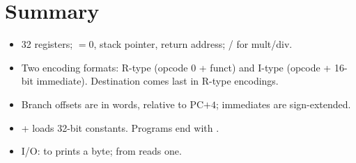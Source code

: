 \section{Summary}
\begin{itemize}
  \item 32 registers; $=0$,  stack pointer,  return address;
        / for mult/div.
  \item Two encoding formats: R-type (opcode 0 + funct) and I-type (opcode + 16-bit immediate).
        Destination comes last in R-type encodings.
  \item Branch offsets are in words, relative to PC$+4$; immediates are sign-extended.
  \item {} +  loads 32-bit constants. Programs end with .
  \item I/O:  to  prints a byte;  from  reads one.
\end{itemize}
